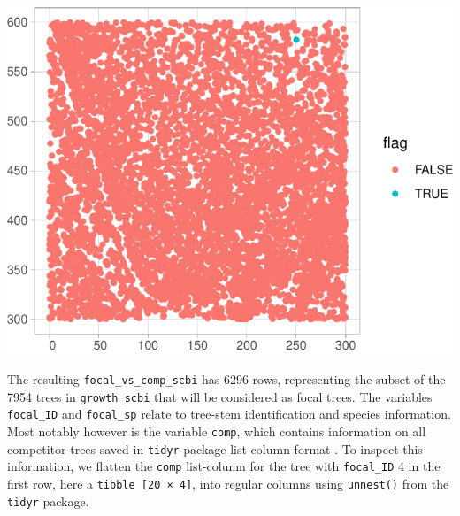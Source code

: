 \documentclass[12pt]{article}
\newenvironment{Shaded}{\begin{snugshade}}{\end{snugshade}}
\newcommand{\CommentTok}[1]{\textcolor[rgb]{0.56,0.35,0.01}{\textit{#1}}}
\newcommand{\DataTypeTok}[1]{\textcolor[rgb]{0.13,0.29,0.53}{#1}}
\newcommand{\DecValTok}[1]{\textcolor[rgb]{0.00,0.00,0.81}{#1}}
\newcommand{\KeywordTok}[1]{\textcolor[rgb]{0.13,0.29,0.53}{\textbf{#1}}}
\newcommand{\NormalTok}[1]{#1}
\newcommand{\OperatorTok}[1]{\textcolor[rgb]{0.81,0.36,0.00}{\textbf{#1}}}
\newcommand{\StringTok}[1]{\textcolor[rgb]{0.31,0.60,0.02}{#1}}
\begin{document}
\begin{center}\includegraphics[width=1\linewidth]{Figures/internal-1} \end{center}

The resulting \texttt{focal\_vs\_comp\_scbi} has 6296 rows, representing
the subset of the 7954 trees in \texttt{growth\_scbi} that will be
considered as focal trees. The variables \texttt{focal\_ID} and
\texttt{focal\_sp} relate to tree-stem identification and species
information. Most notably however is the variable \texttt{comp}, which
contains information on all competitor trees saved in \texttt{tidyr}
package list-column format \citep{tidyr_package}. To inspect this
information, we flatten the \texttt{comp} list-column for the tree with
\texttt{focal\_ID} 4 in the first row, here a
\texttt{tibble\ {[}20\ ×\ 4{]}}, into regular columns using
\texttt{unnest()} from the \texttt{tidyr} package.

\begin{Shaded}
\end{Shaded}
\end{document}
